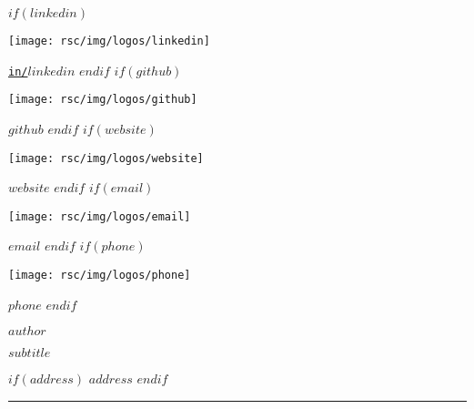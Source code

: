 \documentclass[
$if(fontsize)$
    $fontsize$,
$endif$
$if(lang)$
    $babel-lang$,
$endif$
$if(papersize)$
    $papersize$paper,
$endif$
$for(classoption)$
    $classoption$$sep$,
$endfor$
]{$documentclass$}
\makeatletter
\newcommand{\HRule}{\noindent\rule{\linewidth}{0.1mm}}
\newcommand{\mhref}[2]{\href{#2}{\texttt{#1}}}
\newcommand{\setlocalcolumnwidth}[1]{%
  \let\oldratio\pcol@columnratioleft
  \setcolumnwidth{#1}%
}
\newcommand{\restorelocalcolumnwidth}{%
  \let\pcol@columnratioleft\oldratio%
}
\makeatother
\begin{document}
\pagestyle{allpagestyle}

\thispagestyle{firstpagestyle}
\vspace*{-2cm}
\setlocalcolumnwidth{4cm, 9cm, 4cm}
\begin{paracol}{3}
\begin{flushleft}
    \scriptsize
    \vspace*{\fill}
    $if(linkedin)$
        \begin{minipage}{0.8\baselineskip}
            \texttt{[image: rsc/img/logos/linkedin]}
        \end{minipage}
        \mhref{in/$linkedin$}{https://www.linkedin.com/in/$linkedin$}
        \linebreak
    $endif$
    $if(github)$
        \begin{minipage}{0.8\baselineskip}
            \texttt{[image: rsc/img/logos/github]}
        \end{minipage}
        \mhref{$github$}{https://github.com/$github$}
        \linebreak
    $endif$
    $if(website)$
        \begin{minipage}{0.8\baselineskip}
            \texttt{[image: rsc/img/logos/website]}
        \end{minipage}
        \mhref{$website$}{https://$website$}
        \linebreak
    $endif$
    $if(email)$
        \begin{minipage}{0.8\baselineskip}
            \texttt{[image: rsc/img/logos/email]}
        \end{minipage}
        \mhref{$email$}{mailto:$email$?subject=Heyy!&body=What can I do for you? :)}
        \linebreak
    $endif$
    $if(phone)$
        \begin{minipage}{0.8\baselineskip}
            \texttt{[image: rsc/img/logos/phone]}
        \end{minipage}
        $phone$
    $endif$
\end{flushleft}
\switchcolumn[1]

\begin{center}
    \huge
    \vspace*{\fill}
    \textbf{$author$}
    \vspace{0.1cm}

    \scriptsize
    $subtitle$
\end{center}
\switchcolumn[2]

\begin{flushright}
    \scriptsize
    \vspace*{\fill}
    $if(address)$
        $address$
    $endif$
\end{flushright}
\end{paracol}
\restorelocalcolumnwidth
\vspace{-0.5cm}
\HRule
\vspace{0cm}
\end{document}

